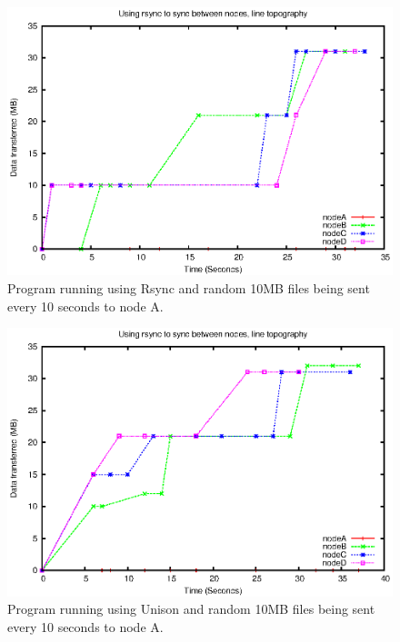 \documentclass[12pt]{article}
\begin{document}
\begin{figure}[ht!]
    \centering
    \includegraphics[height=0.4\textheight]{images/line-rsync-10-fixes.eps}
    \caption{Program running using Rsync and random 10MB files being sent every 10 seconds to node A.}
    \label{fig:line_rsync}
\end{figure}

\begin{figure}[hb!]
    \centering
    \includegraphics[height=0.4\textheight]{images/line-uni-10-fixes.eps}
    \caption{Program running using Unison and random 10MB files being sent every 10 seconds to node A.}
    \label{fig:line_uni}
\end{figure}
\pagebreak
\end{document}
